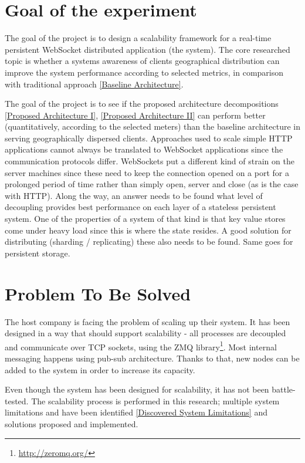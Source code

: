 \documentclass{uvamscse}
\begin{document}
\section{Goal of the experiment}

The goal of the project is to design a scalability framework for a real-time persistent WebSocket distributed application (the system). The core researched topic is whether a systems awareness of clients geographical distribution can improve the system performance according to selected metrics, in comparison with traditional approach \ref{Baseline Architecture}.

The goal of the project is to see if the proposed architecture decompositions \ref{Proposed Architecture I}, \ref{Proposed Architecture II} can perform better (quantitatively, according to the selected meters) than the baseline architecture in serving geographically dispersed clients. Approaches used to scale simple HTTP applications cannot always be translated to WebSocket applications since the communication protocols differ. WebSockets put a different kind of strain on the server machines since these need to keep the connection opened on a port for a prolonged period of time rather than simply open, server and close (as is the case with HTTP). Along the way, an answer needs to be found what level of decoupling provides best performance on each layer of a stateless persistent system. One of the properties of a system of that kind is that key value stores come under heavy load since this is where the state resides. A good solution for distributing (sharding / replicating) these also needs to be found. Same goes for persistent storage.

\section{Problem To Be Solved}
The host company is facing the problem of scaling up their system. It has been designed in a way that should support scalability - all processes are decoupled and communicate over TCP sockets, using the ZMQ library\footnote{\url{http://zeromq.org/}}. Most internal messaging happens using pub-sub architecture. Thanks to that, new nodes can be added to the system in order to increase its capacity.

Even though the system has been designed for scalability, it has not been battle-tested. The scalability process is performed in this research; multiple system limitations and have been identified \ref{Discovered System Limitations} and solutions proposed and implemented.
\end{document}
